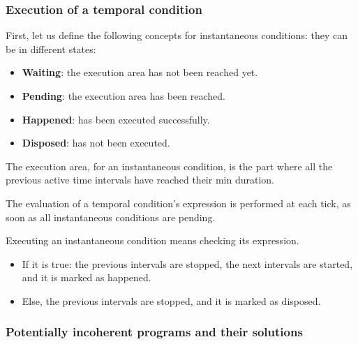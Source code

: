 \documentclass{article}
\begin{document}
\subsubsection{Execution of a temporal condition}

First, let us define the following concepts for instantaneous conditions: they can be in different states:
\begin{itemize}
\item \textbf{Waiting}: the execution area has not been reached yet.
\item \textbf{Pending}: the execution area has been reached.
\item \textbf{Happened}: has been executed successfully.
\item \textbf{Disposed}: has not been executed.
\end{itemize}

The execution area, for an instantaneous condition, is the part where all the previous active time intervals have reached their min duration.

The evaluation of a temporal condition's expression is performed at each tick, as soon as all instantaneous conditions are pending. 

Executing an instantaneous condition means checking its expression.
\begin{itemize}
\item If it is true: the previous intervals are stopped, the next intervals are started, and it is marked as happened. 
\item Else, the previous intervals are stopped, and it is marked as disposed.
\end{itemize}

\subsubsection{Potentially incoherent programs and their solutions}
\end{document}
